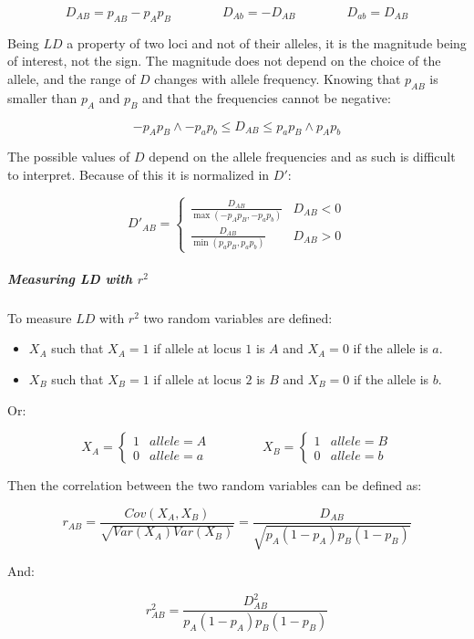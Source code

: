 			$$D_{AB} = p_{AB} - p_Ap_B\qquad\qquad D_{Ab} = -D_{AB}\qquad\qquad D_{ab} = D_{AB}$$

			Being $LD$ a property of two loci and not of their alleles, it is the magnitude being of interest, not the sign.
			The magnitude does not depend on the choice of the allele, and the range of $D$ changes with allele frequency.
			Knowing that $p_{AB}$ is smaller than $p_A$ and $p_B$ and that the frequencies cannot be negative:

			$$-p_Ap_B\land -p_ap_b\le D_{AB}\le p_ap_B\land p_Ap_b$$

			The possible values of $D$ depend on the allele frequencies and as such is difficult to interpret.
			Because of this it is normalized in $D'$:

			$$D'_{AB} = \begin{cases}\frac{D_{AB}}{\max(-p_Ap_B, -p_ap_b)} & D_{AB} < 0\\\frac{D_{AB}}{\min(p_ap_B, p_ap_b)} & D_{AB}>0\end{cases}$$

				\subparagraph{Measuring LD with $r^2$}
				To measure $LD$ with $r^2$ two random variables are defined:

				\begin{multicols}{2}
					\begin{itemize}
						\item $X_A$ such that $X_A=1$ if allele at locus $1$ is $A$ and $X_A=0$ if the allele is $a$.
						\item $X_B$ such that $X_B=1$ if allele at locus $2$ is $B$ and $X_B=0$ if the allele is $b$.
					\end{itemize}
				\end{multicols}

				Or:

				$$X_A = \begin{cases}1 & allele=A\\0 & allele = a\end{cases}\qquad\qquad X_B = \begin{cases}1 & allele = B\\0 & allele = b\end{cases}$$

				Then the correlation between the two random variables can be defined as:

				$$r_{AB} = \frac{Cov(X_A, X_B)}{\sqrt{Var(X_A)Var(X_B)}} = \frac{D_{AB}}{\sqrt{p_A(1-p_A)p_B(1-p_B)}}$$

				And:

				$$r^2_{AB} = \frac{D^2_{AB}}{p_A(1-p_A)p_B(1-p_B)}$$

